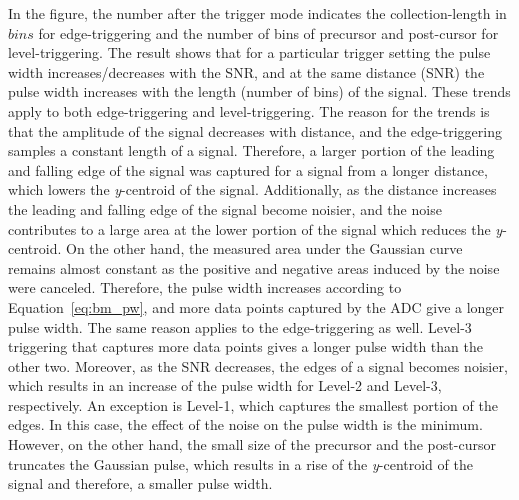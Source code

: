In the figure, the number after the trigger mode indicates the collection-length in $bins$ for edge-triggering and the number of bins of precursor and post-cursor for level-triggering. The result shows that for a particular trigger setting the pulse width increases/decreases with the SNR, and at the same distance (SNR) the pulse width increases with the length (number of bins) of the signal. These trends apply to both edge-triggering and level-triggering. The reason for the trends is that the amplitude of the signal decreases with distance, and the edge-triggering samples a constant length of a signal. Therefore, a larger portion of the leading and falling edge of the signal was captured for a signal from a longer distance, which lowers the \textit{y}-centroid of the signal. Additionally, as the distance increases the leading and falling edge of the signal become noisier, and the noise contributes to a large area at the lower portion of the signal which reduces the \textit{y}-centroid. On the other hand, the measured area under the Gaussian curve remains almost constant as the positive and negative areas induced by the noise were canceled. Therefore, the pulse width increases according to Equation~\eqref{eq:bm_pw}, and more data points captured by the ADC give a longer pulse width. The same reason applies to the edge-triggering as well. Level-3 triggering that captures more data points gives a longer pulse width than the other two. Moreover, as the SNR decreases, the edges of a signal becomes noisier, which results in an increase of the pulse width for Level-2 and Level-3, respectively. An exception is Level-1, which captures the smallest portion of the edges. In this case, the effect of the noise on the pulse width is the minimum. However, on the other hand, the small size of the precursor and the post-cursor truncates the Gaussian pulse, which results in a rise of the \textit{y}-centroid of the signal and therefore, a smaller pulse width. \par
